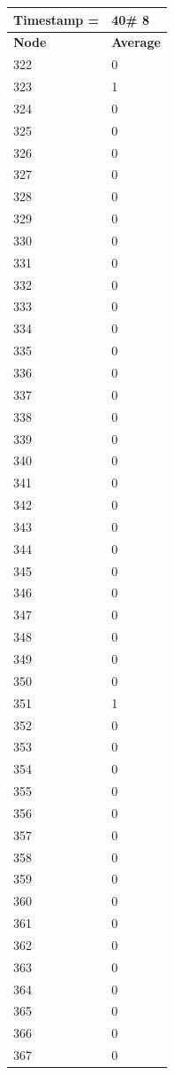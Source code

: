 \begin{tabular}{|l||l|}
\hline
\textbf{Timestamp =} & \textbf{40}\# 8\\\hline
	\textbf{Node} & \textbf{Average} \\ \hline
\hline
	322 & 0 \\ \hline
	323 & 1 \\ \hline
	324 & 0 \\ \hline
	325 & 0 \\ \hline
	326 & 0 \\ \hline
	327 & 0 \\ \hline
	328 & 0 \\ \hline
	329 & 0 \\ \hline
	330 & 0 \\ \hline
	331 & 0 \\ \hline
	332 & 0 \\ \hline
	333 & 0 \\ \hline
	334 & 0 \\ \hline
	335 & 0 \\ \hline
	336 & 0 \\ \hline
	337 & 0 \\ \hline
	338 & 0 \\ \hline
	339 & 0 \\ \hline
	340 & 0 \\ \hline
	341 & 0 \\ \hline
	342 & 0 \\ \hline
	343 & 0 \\ \hline
	344 & 0 \\ \hline
	345 & 0 \\ \hline
	346 & 0 \\ \hline
	347 & 0 \\ \hline
	348 & 0 \\ \hline
	349 & 0 \\ \hline
	350 & 0 \\ \hline
	351 & 1 \\ \hline
	352 & 0 \\ \hline
	353 & 0 \\ \hline
	354 & 0 \\ \hline
	355 & 0 \\ \hline
	356 & 0 \\ \hline
	357 & 0 \\ \hline
	358 & 0 \\ \hline
	359 & 0 \\ \hline
	360 & 0 \\ \hline
	361 & 0 \\ \hline
	362 & 0 \\ \hline
	363 & 0 \\ \hline
	364 & 0 \\ \hline
	365 & 0 \\ \hline
	366 & 0 \\ \hline
	367 & 0 \\ \hline
\end{tabular}
